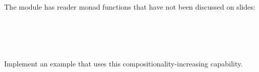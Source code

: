 \documentclass{article}
\begin{document}
\begin{exercise}
  The {} module has reader monad functions that have not been
  discussed on slides:\\
  {}{}{\hlopt{= }}{}{}{\hlopt{-> }}{}{\hlopt{(}}{}{}{\hlopt{->
  }}{}{\hlopt{(}}{}{\hlopt{))}}{\hlendline{}}\\
  {}{}{\hlopt{=
  }}{}{}{\hlopt{->}}{\hlendline{}}\\
  {}{\hlopt{(}}{}{}{\hlopt{->
  }}{}{}{}{}{\hlopt{-> ()
  \textbar }}{}{}{\hlopt{-> }}{}{\hlopt{)}}{\hlendline{}}\\
  {}{}{\hlopt{: (}}{}{\hlopt{->
  }}{}{\hlopt{) -> (}}{}{\hlopt{, }}{}{\hlopt{)
  }}{}{\hlopt{-> (}}{}{\hlopt{, }}{}{\hlopt{)
  }}{}{\hlendline{}}\\
  {}{}{\hlopt{: (}}{}{\hlopt{-> }}{}{}{\hlopt{) ->
  (}}{}{\hlopt{, }}{}{\hlopt{) }}{}{\hlopt{->
  (}}{}{\hlopt{, }}{}{\hlopt{)
  }}{}{\hlendline{}}
  
  Implement an example that uses this compositionality-increasing capability.
\end{exercise}

\
\end{document}
